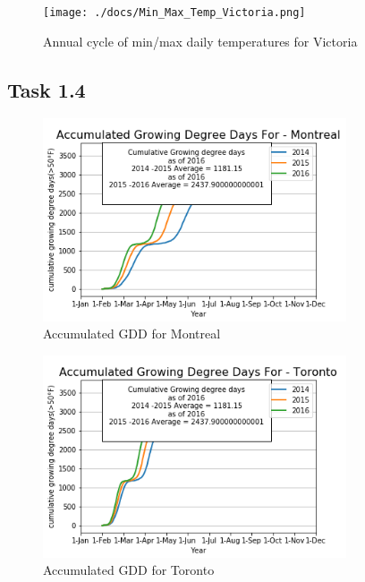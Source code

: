 \documentclass[12pt]{article}
\begin{document}
\begin{figure}[!htbp]
\centering
\texttt{[image: ./docs/Min\_Max\_Temp\_Victoria.png]} 
\caption{\scriptsize Annual cycle of min/max daily temperatures for Victoria}
\label{minmax_vict}		  
\end{figure}

\pagebreak
\subsection{Task 1.4}	

\begin{figure}[!htbp]
\centering
\includegraphics[width=0.8\textwidth]{./docs/MontrealGDD.png} 
\caption{\scriptsize Accumulated GDD for Montreal}
\label{accuGDD_1}		  
\end{figure}

\begin{figure}[!htbp]
\centering
\includegraphics[width=0.8\textwidth]{./docs/TorontoGDD.png} 
\caption{\scriptsize Accumulated GDD for Toronto}
\label{accuGDD_2}		  
\end{figure}
	
\end{document}
